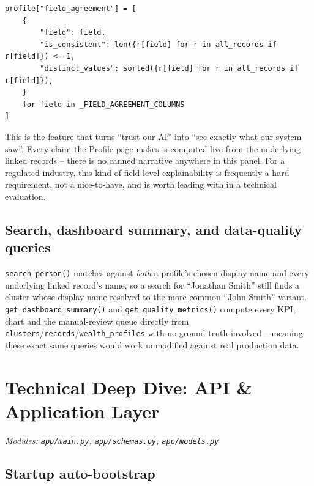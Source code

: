 \documentclass[11pt]{report}
\newcommand{\code}[1]{\lstinline[style=plain]!#1!}
\begin{document}
\begin{lstlisting}[style=py, caption={Field agreement (\texttt{wealth\_service.py}, \texttt{get\_profile\_detail()})}]
profile["field_agreement"] = [
    {
        "field": field,
        "is_consistent": len({r[field] for r in all_records if r[field]}) <= 1,
        "distinct_values": sorted({r[field] for r in all_records if r[field]}),
    }
    for field in _FIELD_AGREEMENT_COLUMNS
]
\end{lstlisting}

\begin{bizbox}
This is the feature that turns ``trust our AI'' into ``see exactly what our system saw''. Every claim the Profile page makes is computed live from the underlying linked records -- there is no canned narrative anywhere in this panel. For a regulated industry, this kind of field-level explainability is frequently a hard requirement, not a nice-to-have, and is worth leading with in a technical evaluation.
\end{bizbox}

\section{Search, dashboard summary, and data-quality queries}

\code{search_person()} matches against \emph{both} a profile's chosen display name and every underlying linked record's name, so a search for ``Jonathan Smith'' still finds a cluster whose display name resolved to the more common ``John Smith'' variant. \code{get_dashboard_summary()} and \code{get_quality_metrics()} compute every KPI, chart and the manual-review queue directly from \code{clusters}/\code{records}/\code{wealth_profiles} with no ground truth involved -- meaning these exact same queries would work unmodified against real production data.

\chapter{Technical Deep Dive: API \& Application Layer}
\label{ch:api}

\textit{Modules: \texttt{app/main.py}, \texttt{app/schemas.py}, \texttt{app/models.py}}

\section{Startup auto-bootstrap}
\end{document}

